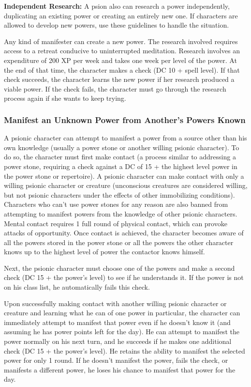 \textbf{Independent Research:} A psion also can research a power independently, duplicating an existing power or creating an entirely new one. If characters are allowed to develop new powers, use these guidelines to handle the situation.

Any kind of manifester can create a new power. The research involved requires access to a retreat conducive to uninterrupted meditation. Research involves an expenditure of 200 XP per week and takes one week per level of the power. At the end of that time, the character makes a  check (DC 10 + spell level). If that check succeeds, the character learns the new power if her research produced a viable power. If the check fails, the character must go through the research process again if she wants to keep trying.

\subsubsection{Manifest an Unknown Power from Another's Powers Known}
A psionic character can attempt to manifest a power from a source other than his own knowledge (usually a power stone or another willing psionic character). To do so, the character must first make contact (a process similar to addressing a power stone, requiring a  check against a DC of 15 + the highest level power in the power stone or repertoire). A psionic character can make contact with only a willing psionic character or creature (unconscious creatures are considered willing, but not psionic characters under the effects of other immobilizing conditions). Characters who can't use power stones for any reason are also banned from attempting to manifest powers from the knowledge of other psionic characters. Mental contact requires 1 full round of physical contact, which can provoke attacks of opportunity. Once contact is achieved, the character becomes aware of all the powers stored in the power stone or all the powers the other character knows up to the highest level of power the contactor knows himself.

Next, the psionic character must choose one of the powers and make a second  check (DC 15 + the power's level) to see if he understands it. If the power is not on his class list, he automatically fails this check.

Upon successfully making contact with another willing psionic character or creature and learning what he can of one power in particular, the character can immediately attempt to manifest that power even if he doesn't know it (and assuming he has power points left for the day). He can attempt to manifest the power normally on his next turn, and he succeeds if he makes one additional  check (DC 15 + the power's level). He retains the ability to manifest the selected power for only 1 round. If he doesn't manifest the power, fails the  check, or manifests a different power, he loses his chance to manifest that power for the day.

